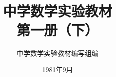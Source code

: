 \documentclass[b5paper, openany]{ctexbook}
\theoremstyle{plain}
\begin{document}
\title{\Huge\bfseries 中学数学实验教材\\第一册（下）}



\author{\Large 中学数学实验教材编写组编}
\date{\Large 1981年9月}

\maketitle




\frontmatter


\tableofcontents


\mainmatter

% 
%
% 
% 

\setcounter{chapter}{3}


 

 
\end{document}

